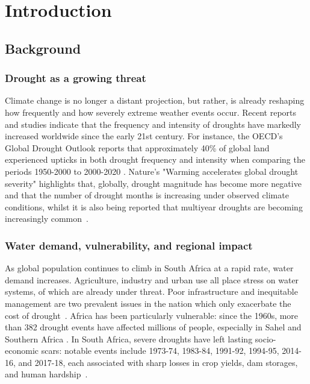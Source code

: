 \graphicspath{{introduction/fig/}}

\chapter{Introduction}
\label{chap:introduction}

\section{Background}

\subsection{Drought as a growing threat}

Climate change is no longer a distant projection, but rather, is already reshaping how frequently and how severely extreme weather events occur. Recent reports and studies indicate that the frequency and intensity of droughts have markedly increased worldwide since the early 21st century. For instance, the OECD’s Global Drought Outlook reports that approximately 40\% of global land experienced upticks in both drought frequency and intensity when comparing the periods 1950-2000 to 2000-2020 \cite{Tyndall_2025}. Nature's "Warming accelerates global drought severity" highlights that, globally, drought magnitude has become more negative and that the number of drought months is increasing under observed climate conditions, whilst it is also being reported that multiyear droughts are becoming increasingly common~\cite{Gebrechorkos2025, Chen2025}.

\subsection{Water demand, vulnerability, and regional impact}

As global population continues to climb in South Africa at a rapid rate, water demand increases. Agriculture, industry and urban use all place stress on water systems, of which are already under threat. Poor infrastructure and inequitable management are two prevalent issues in the nation which only exacerbate the cost of drought~\cite{Olagunju19052019, Gebrechorkos2025}. Africa has been particularly vulnerable: since the 1960s, more than 382 drought events have affected millions of people, especially in Sahel and Southern Africa \cite{SHIFERAW201467, Tyndall_2025}. In South Africa, severe droughts have left lasting socio-economic scars: notable events include 1973-74, 1983-84, 1991-92, 1994-95, 2014-16, and 2017-18, each associated with sharp losses in crop yields, dam storages, and human hardship~\cite{Botai2017, su14137582, BAUDOIN2017128, Sousa_2018}. 

